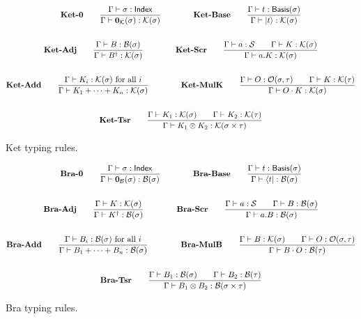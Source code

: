 \documentclass{article}
\begin{document}
\begin{figure}[h]
    \begin{gather*}
        \textbf{Ket-0} \qquad
        \frac{\Gamma \vdash \sigma : \mathsf{Index}}{\Gamma \vdash \mathbf{0}_\mathcal{K}(\sigma) : \mathcal{K}(\sigma)} 
        \qquad \qquad
        \textbf{Ket-Base} \qquad
        \frac{\Gamma\vdash t : \mathsf{Basis}(\sigma)}{\Gamma \vdash \ket{t} : \mathcal{K}(\sigma)} \\
        \\
        \textbf{Ket-Adj} \qquad
        \frac{\Gamma \vdash B : \mathcal{B}(\sigma)}{\Gamma \vdash B^\dagger : \mathcal{K}(\sigma)} 
        \qquad \qquad
        \textbf{Ket-Scr} \qquad
        \frac{\Gamma \vdash a : \mathcal{S} \qquad \Gamma \vdash K : \mathcal{K}(\sigma)}{\Gamma \vdash a.K : \mathcal{K}(\sigma)} \\
        \\
        \textbf{Ket-Add} \qquad
        \frac{\Gamma \vdash K_i : \mathcal{K}(\sigma) \text{ for all $i$}}{\Gamma \vdash K_1 + \cdots + K_n : \mathcal{K}(\sigma)}
        \qquad \qquad
        \textbf{Ket-MulK} \qquad
        \frac{\Gamma \vdash O : \mathcal{O}(\sigma, \tau) \qquad \Gamma \vdash K : \mathcal{K}(\tau)}{\Gamma \vdash O \cdot K : \mathcal{K}(\sigma)} \\
        \\
        \textbf{Ket-Tsr} \qquad
        \frac{\Gamma \vdash K_1 : \mathcal{K}(\sigma) \qquad \Gamma \vdash K_2 : \mathcal{K}(\tau)} {\Gamma \vdash K_1 \otimes K_2 : \mathcal{K}(\sigma \times \tau)}
    \end{gather*}
    \caption{Ket typing rules.}
\end{figure}

\begin{figure}[h]
    \begin{gather*}
        \textbf{Bra-0} \qquad
        \frac{\Gamma \vdash \sigma : \mathsf{Index}}{\Gamma \vdash \mathbf{0}_\mathcal{B}(\sigma) : \mathcal{B}(\sigma)} 
        \qquad \qquad
        \textbf{Bra-Base} \qquad
        \frac{\Gamma\vdash t : \mathsf{Basis}(\sigma)}{\Gamma \vdash \bra{t} : \mathcal{B}(\sigma)} \\
        \\
        \textbf{Bra-Adj} \qquad
        \frac{\Gamma \vdash K : \mathcal{K}(\sigma)}{\Gamma \vdash K^\dagger : \mathcal{B}(\sigma)} 
        \qquad \qquad
        \textbf{Bra-Scr} \qquad
        \frac{\Gamma \vdash a : \mathcal{S} \qquad \Gamma \vdash B : \mathcal{B}(\sigma)}{\Gamma \vdash a.B : \mathcal{B}(\sigma)} \\
        \\
        \textbf{Bra-Add} \qquad
        \frac{\Gamma \vdash B_i : \mathcal{B}(\sigma) \text{ for all $i$}}{\Gamma \vdash B_1 + \cdots + B_n : \mathcal{B}(\sigma)}
        \qquad \qquad
        \textbf{Bra-MulB} \qquad
        \frac{\Gamma \vdash B : \mathcal{K}(\sigma) \qquad \Gamma \vdash O : \mathcal{O}(\sigma, \tau)}{\Gamma \vdash B \cdot O : \mathcal{B}(\tau)} \\
        \\
        \textbf{Bra-Tsr} \qquad
        \frac{\Gamma \vdash B_1 : \mathcal{B}(\sigma) \qquad \Gamma \vdash B_2 : \mathcal{B}(\tau)} {\Gamma \vdash B_1 \otimes B_2 : \mathcal{B}(\sigma \times \tau)}
    \end{gather*}
    \caption{Bra typing rules.}
\end{figure}
\end{document}

